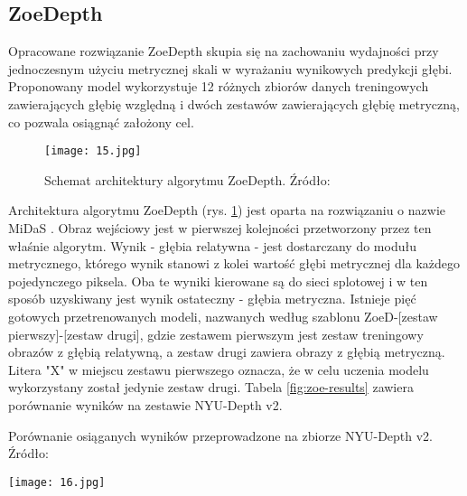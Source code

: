 \subsection{ZoeDepth}
Opracowane rozwiązanie ZoeDepth \cite{bhat2023} skupia się na zachowaniu wydajności przy jednoczesnym użyciu metrycznej skali w wyrażaniu wynikowych predykcji głębi. Proponowany model wykorzystuje 12 różnych zbiorów danych treningowych zawierających głębię względną i dwóch zestawów zawierających głębię metryczną, co pozwala osiągnąć założony cel.
\begin{figure}[H]
    \centering
    \texttt{[image: 15.jpg]}
    \caption{Schemat architektury algorytmu ZoeDepth. Źródło: \cite{bhat2023}}
    \label{fig:zoe-schema}
\end{figure}
Architektura algorytmu ZoeDepth (rys. \ref{fig:zoe-schema}) jest oparta na rozwiązaniu o nazwie MiDaS \cite{ranftl2020}. Obraz wejściowy jest w pierwszej kolejności przetworzony przez ten właśnie algorytm. Wynik - głębia relatywna - jest dostarczany do modułu metrycznego, którego wynik stanowi z kolei wartość głębi metrycznej dla każdego pojedynczego piksela. Oba te wyniki kierowane są do sieci splotowej i w ten sposób uzyskiwany jest wynik ostateczny - głębia metryczna. Istnieje pięć gotowych przetrenowanych modeli, nazwanych według szablonu ZoeD-[zestaw pierwszy]-[zestaw drugi], gdzie zestawem pierwszym jest zestaw treningowy obrazów z głębią relatywną, a zestaw drugi zawiera obrazy z głębią metryczną. Litera "X" w miejscu zestawu pierwszego oznacza, że w celu uczenia modelu wykorzystany został jedynie zestaw drugi. Tabela \ref{fig:zoe-results} zawiera porównanie wyników na zestawie NYU-Depth v2.
\begin{table}[H]
    \centering
    \caption{Porównanie osiąganych wyników przeprowadzone na zbiorze NYU-Depth v2. Źródło: \cite{bhat2023}}
    \texttt{[image: 16.jpg]}
    \label{fig:zoe-results}
\end{table}

